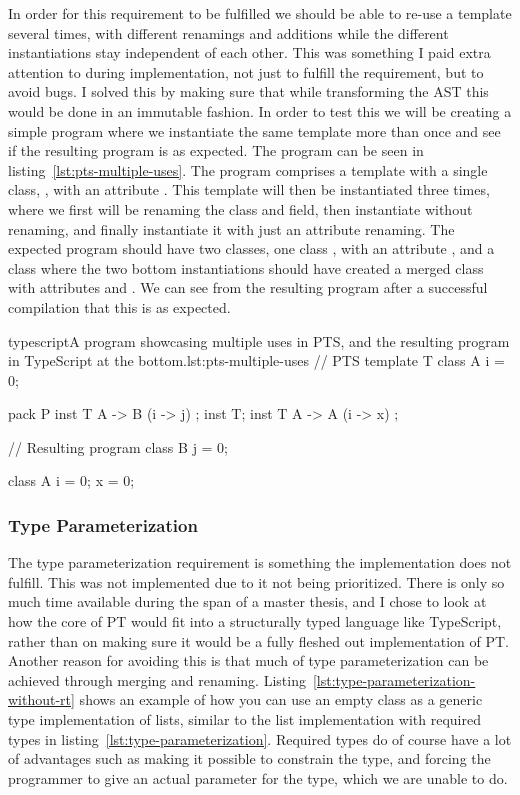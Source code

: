 In order for this requirement to be fulfilled we should be able to re-use a template several times, with different renamings and additions while the different instantiations stay independent of each other.
This was something I paid extra attention to during implementation, not just to fulfill the requirement, but to avoid bugs.
I solved this by making sure that while transforming the AST this would be done in an immutable fashion.
In order to test this we will be creating a simple program where we instantiate the same template more than once and see if the resulting program is as expected.
The program can be seen in listing~\vref{lst:pts-multiple-uses}.
The program comprises a template  with a single class, , with an attribute .
This template will then be instantiated three times, where we first will be renaming the class and field, then instantiate without renaming, and finally instantiate it with just an attribute renaming.
The expected program should have two classes, one class , with an attribute , and a class  where the two bottom instantiations should have created a merged class with attributes  and .
We can see from the resulting program after a successful compilation that this is as expected.

\begin{code}{typescript}{A program showcasing multiple uses in PTS, and the resulting program in TypeScript at the bottom.}{lst:pts-multiple-uses}
    // PTS
    template T {
        class A {
            i = 0;
        }
    }

    pack P {
        inst T { A -> B (i -> j) };
        inst T;
        inst T { A -> A (i -> x) };
    }

    // Resulting program
    class B {
        j = 0;
    }

    class A {
        i = 0;
        x = 0;
    }
\end{code}

\subsubsection{Type Parameterization}\label{subsubsec:pts-type-parameterization}

The type parameterization requirement is something the implementation does not fulfill.
This was not implemented due to it not being prioritized.
There is only so much time available during the span of a master thesis, and I chose to look at how the core of PT would fit into a structurally typed language like TypeScript, rather than on making sure it would be a fully fleshed out implementation of PT\@.
Another reason for avoiding this is that much of type parameterization can be achieved through merging and renaming.
Listing~\vref{lst:type-parameterization-without-rt} shows an example of how you can use an empty class as a generic type implementation of lists, similar to the list implementation with required types in listing~\vref{lst:type-parameterization}.
Required types do of course have a lot of advantages such as making it possible to constrain the type, and forcing the programmer to give an actual parameter for the type, which we are unable to do.

